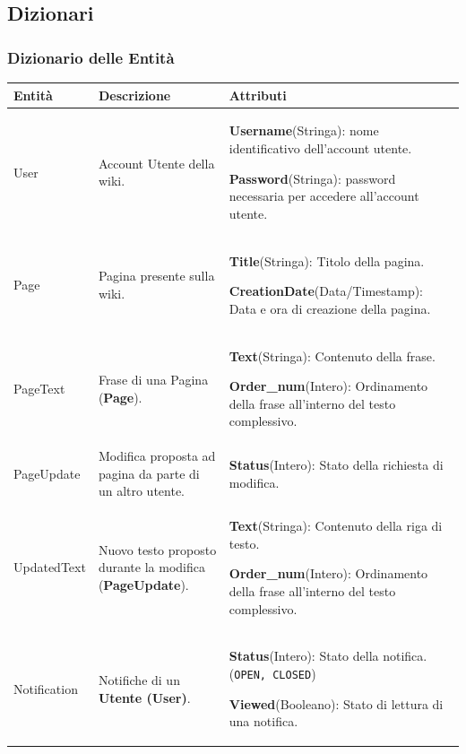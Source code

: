 \documentclass{article}
\begin{document}
		\subsection{Dizionari}
		{\subsubsection{Dizionario delle Entità}}
		
		\begin{table}[H]
			\centering
			\small %
			\setlength{\tabcolsep}{6pt} %
			\renewcommand{\arraystretch}{1.2} %
			
			\begin{tabularx}{\textwidth}{|l|X|X|}
				\hline
				\textbf{Entità} & \textbf{Descrizione} & \textbf{Attributi} \\
				\hline
				User & Account Utente della wiki. & 
				\textbf{Username}(Stringa): nome identificativo dell'account utente.
				
				\textbf{Password}(Stringa): password necessaria
				per accedere all’account utente. \\
				\hline
				Page & Pagina presente sulla wiki. & 
				\textbf{Title}(Stringa): Titolo della pagina.
				
				\textbf{CreationDate}(Data/Timestamp): Data e ora di creazione della pagina.
				\\
				\hline
				PageText & Frase di una Pagina (\textbf{Page}). &
				\textbf{Text}(Stringa): Contenuto della frase.
				
				\textbf{Order\_num}(Intero): Ordinamento della frase all'interno del testo complessivo.
				\\
				\hline
				PageUpdate & Modifica proposta ad pagina da parte di un altro utente. & 
				\textbf{Status}(Intero): Stato della richiesta di modifica.
				\\
				\hline
				UpdatedText & Nuovo testo proposto durante la modifica (\textbf{PageUpdate}). & 
				\textbf{Text}(Stringa): Contenuto della riga di testo.
				
				\textbf{Order\_num}(Intero): Ordinamento della frase all'interno del testo complessivo.
				\\
				\hline
				Notification & Notifiche di un \textbf{Utente (User)}.& 
				\textbf{Status}(Intero): Stato della notifica. (\texttt{OPEN, CLOSED})
				
				\textbf{Viewed}(Booleano): Stato di lettura di una notifica.
				

\end{tabularx}
\end{table}
\end{document}
